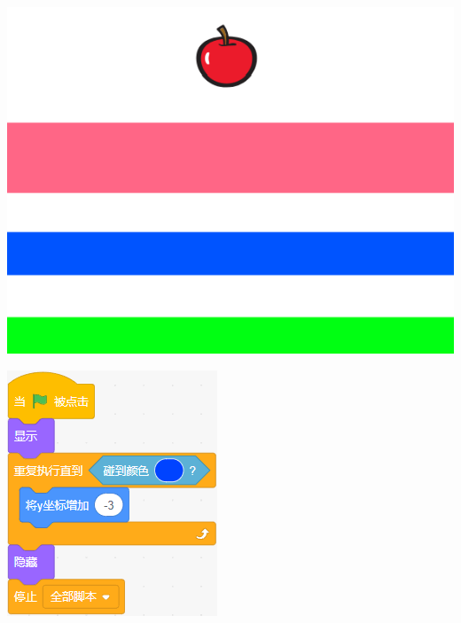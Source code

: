 \documentclass[10pt, a4paper]{article}
\begin{document}
\begin{enumerate}
        \begin{minipage}{.22\textwidth}
            \centering
            \includegraphics[width=\textwidth]{figure/7-1.png}
        \end{minipage}
        \begin{minipage}{.17\textwidth}
            \centering
            \includegraphics[width=\textwidth]{figure/7-2.png}

\end{minipage}
\end{enumerate}
\end{document}

